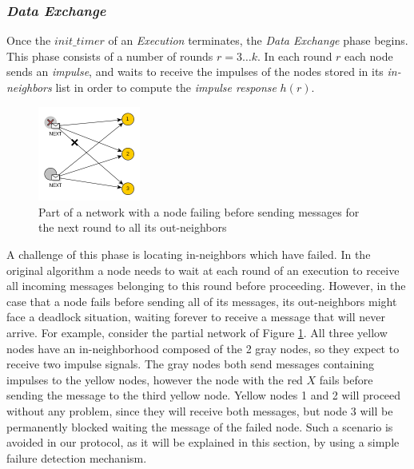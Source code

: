 \documentclass[a4paper,11pt,twoside]{report}
\begin{document}
 
  
\subsubsection*{\textit{Data Exchange}}

Once the $init\_timer$ of an \textit{Execution} terminates, the \textit{Data Exchange} phase begins. This phase consists of a number of rounds $r=3\dots k$. In each round $r$ each node sends an \textit{impulse}, and waits to receive the impulses of the nodes stored in its \textit{in-neighbors} list in order to compute the \textit{impulse response} $h(r)$.\\

\begin{figure} [b]
\centering
\includegraphics[width=0.3\textwidth]{../figures/partial_network.png}
\caption{Part of a network with a node failing before sending messages for the next round to all its out-neighbors}
\label{fig:partial_network}
\end{figure}

A challenge of this phase is locating in-neighbors which have failed. In the original algorithm a node needs to wait at each round of an execution to receive all incoming messages belonging to this round before proceeding. However, in the case that a node fails before sending all of its messages, its out-neighbors might face a deadlock situation, waiting forever to receive a message that will never arrive. For example, consider the partial network of Figure \ref{fig:partial_network}. All three yellow nodes have an in-neighborhood composed of the 2 gray nodes, so they expect to receive two impulse signals. The gray nodes both send messages containing impulses to the yellow nodes, however the node with the red $X$ fails before sending the message to the third yellow node. Yellow nodes 1 and 2 will proceed without any problem, since they will receive both messages, but node 3 will be permanently blocked waiting the message of the failed node. Such a scenario is avoided in our protocol, as it will be explained in this section, by using a simple failure detection mechanism.\\
\end{document}
